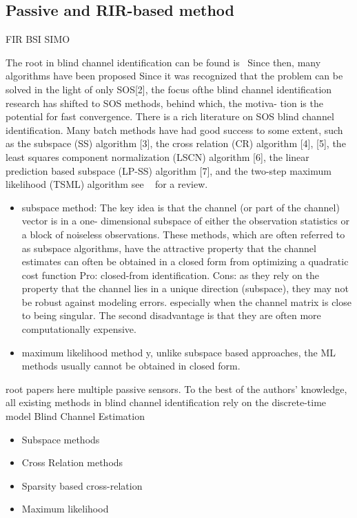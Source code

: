 \subsection{Passive and RIR-based method}
FIR BSI SIMO

The root in blind channel identification can be found is~
Since then, many algorithms have been proposed
Since it was recognized that the problem can be solved in the light of only SOS[2], the focus ofthe blind channel identification research has shifted to SOS methods, behind which, the motiva- tion is the potential for fast convergence. There is a rich literature on SOS blind channel identification. Many batch methods have had good success to some extent, such as the subspace (SS) algorithm [3], the cross relation (CR) algorithm [4], [5], the least squares component normalization (LSCN) algorithm [6], the linear prediction based subspace (LP-SS) algorithm [7], and the two-step maximum likelihood (TSML) algorithm
see ~ for a review.
\begin{itemize}
    \item subspace method: The key idea is that the channel (or part of the channel) vector is in a one- dimensional subspace of either the observation statistics or a block of noiseless observations.
    These methods, which are often referred to as subspace algorithms, have the attractive property that the channel estimates can often be obtained in a closed form from optimizing a quadratic cost function
    Pro: closed-from identification.
    Cons: as they rely on the property that the channel lies in a unique direction (subspace), they may not be robust against modeling errors.
    especially when the channel matrix is close to being singular.
    The second disadvantage is that they are often more computationally expensive.
    \item maximum likelihood method y, unlike subspace based approaches, the ML methods usually cannot be obtained in closed form.
\end{itemize}

root papers 
here multiple passive sensors.
To the best of the authors’ knowledge, all existing methods in blind channel identification rely on the discrete-time model
Blind Channel Estimation~
\begin{itemize}
    \item Subspace methods
    \item Cross Relation methods
    \item Sparsity based cross-relation
    \item Maximum likelihood
\end{itemize}

